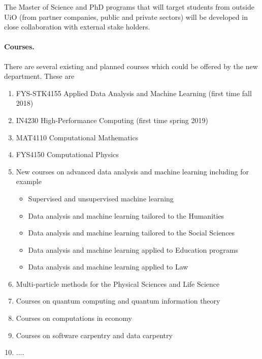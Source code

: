 \documentclass[oneside,final,10pt]{article}
\begin{document}
\noindent
The Master of Science and PhD programs that will target students from outside UiO (from partner companies, public and private sectors)
will be developed in close collaboration with external stake holders. 

\paragraph{Courses.}
There are several existing and planned courses which could be offered by the new department.
These are
\begin{enumerate}
\item FYS-STK4155 Applied Data Analysis and Machine Learning  (first time fall 2018)

\item IN4230 High-Performance Computing  (first time spring 2019)

\item MAT4110 Computational Mathematics

\item FYS4150 Computational Physics

\item New courses on advanced data analysis and machine learning including for example
\begin{itemize}

  \item Supervised and unsupervised machine learning

  \item Data analysis and machine learning tailored to the Humanities

  \item Data analysis and machine learning tailored to the Social Sciences

  \item Data analysis and machine learning applied to Education programs

  \item Data analysis and machine learning applied to Law 

\end{itemize}

\noindent
\item Multi-particle methods for the Physical Sciences and Life Science

\item Courses on quantum computing and quantum information theory

\item Courses on computations in economy

\item Courses on software carpentry and data carpentry

\item ....
\end{enumerate}
\end{document}
